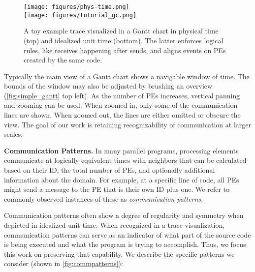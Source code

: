 \begin{figure}
    \centering
    \texttt{[image: figures/phys-time.png]}\\
    \vspace{1ex}
    \texttt{[image: figures/tutorial\_gc.png]}
    \caption{A toy example trace visualized in a Gantt chart in physical time (top) and idealized unit time (bottom). The latter enforces logical rules, like receives happening after sends, and aligns events on PEs created by the same code.}
    \label{fig:physical-logical}
\end{figure}

Typically the main view of a Gantt chart shows a navigable window of time. The bounds of the window may also be adjusted by brushing an overview (\autoref{fig:simple_gantt} top left). As the number of PEs increases, vertical panning and zooming can be used. When zoomed in, only some of the communication lines are shown. When zoomed out, the lines are either omitted or obscure the view. The goal of our work is retaining recognizability of communication at larger scales.

\vspace{1ex}

\textbf{Communication Patterns.} In many parallel programs, processing elements communicate at logically equivalent times with neighbors that can be calculated based on their ID, the total number of PEs, and optionally additional information about the domain. For example, at a specific line of code, all PEs might send a message to the PE that is their own ID plus one. We refer to commonly observed instances of these as {\em communication patterns.}

Communication patterns often show a degree of regularity and symmetry when depicted in idealized unit time. When recognized in a trace visualization, communication patterns can serve as an indicator of what part of the source code is being executed and what the program is trying to accomplish. Thus, we focus this work on preserving that capability. We describe the specific patterns we consider (shown in \autoref{fig:commpatterns}):

